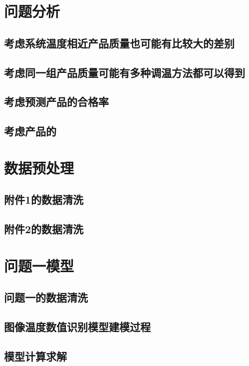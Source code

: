 \documentclass{cumcmthesis}
\begin{document}
	\section{问题分析}
	
	\subsection{考虑系统温度相近产品质量也可能有比较大的差别}
	
	
	\subsection{考虑同一组产品质量可能有多种调温方法都可以得到}
	\subsection{考虑预测产品的合格率}
	
	\subsection{考虑产品的}
	
	\section{数据预处理}
	\subsection{附件1的数据清洗}
	\subsection{附件2的数据清洗}
	
	\section{问题一模型}
	
	\subsection{问题一的数据清洗}
	
	\subsection{图像温度数值识别模型建模过程}
	
	\subsection{模型计算求解}
	
\end{document}
